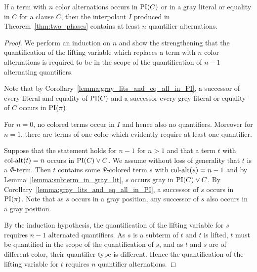 \begin{lemma}
	\label{lemma:quant_alt_lower_bound}
	If a term with $n$ color alternations occurs in $\operatorname{PI}(C)$ or in a gray literal or equality in $C$ for a clause $C$, then the interpolant $I$ produced in Theorem~\ref{thm:two_phases} contains at least $n$ quantifier alternations.
\end{lemma}
\begin{proof}
	We perform an induction on $n$
	and show the strengthening that
	the quantification of the lifting variable which replaces a term with $n$ color alternations is required to be in the scope of the quantification of $n-1$ alternating quantifiers.

	Note that by Corollary~\ref{lemma:gray_lits_and_eq_all_in_PI}, a successor of every literal and equality of $\operatorname{PI}(C)$ and a successor every grey literal or equality of $C$ occurs in $\operatorname{PI}(\pi)$.

	For $n=0$, no colored terms occur in $I$ and hence also no quantifiers.
	Moreover for $n=1$, there are terms of one color which evidently require at least one quantifier.

	Suppose that the statement holds for $n-1$ for $n>1$ and that a term $t$ with $\operatorname{col-alt}(t) = n$ occurs in $\operatorname{PI}(C) \lor C$.
	We assume without loss of generality that $t$ is a $\Phi$-term.
	Then $t$ contains some $\Psi$-colored term $s$ with $\operatorname{col-alt}(s) = n-1$ and
	by Lemma~\ref{lemma:subterm_in_gray_lit}, $s$ occurs gray in $\operatorname{PI}(C) \lor C$.
	By Corollary~\ref{lemma:gray_lits_and_eq_all_in_PI}, a successor of $s$ occurs in $\operatorname{PI}(\pi)$. Note that as $s$ occurs in a gray position, any successor of $s$ also occurs in a gray position.

	By the induction hypothesis, the quantification of the lifting variable for $s$ requires $n-1$ alternated quantifiers.
	As $s$ is a subterm of $t$ and $t$ is lifted, $t$ must be quantified in the scope of the quantification of $s$, and as $t$ and $s$ are of different color, their quantifier type is different. 
	Hence the quantification of the lifting variable for $t$ requires $n$ quantifier alternations.
\end{proof}

\begin{comment}
\begin{lemma}
	\label{lemma:quant_alt_lower_bound_old}
	If a term with $n$ color alternations occurs in $\PI^*(C) \lor C$ for a clause $C$, then the interpolant $I$ produced in Theorem~\ref{thm:two_phases} contains at least $n-1$ quantifier alternations.
\end{lemma}
\begin{proof}
	By Lemma~\ref{lemma:subterm_in_gray_lit}, a term with $n-1$ color alternations occurs in a gray literal or an equality in $\PI(C) \lor C$.
	Lemma~\ref{lemma:col_alt_in_gray_lit_then_quant_alt} gives the result.
\end{proof}
\end{comment}

